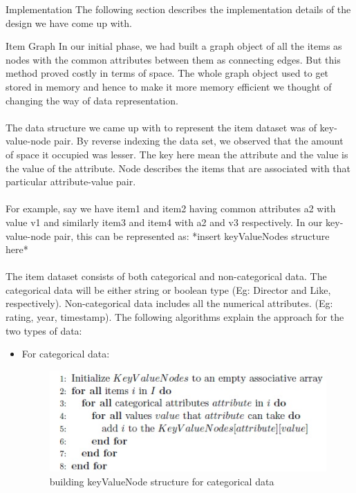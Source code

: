 \documentclass{report}
\begin{document}
\begin{projChapter}{Implementation}
        The following section describes the implementation details of the design we have come up with.
        \begin{projSection}{Item Graph}
            In our initial phase, we had built a graph object of all the items as nodes with the common attributes between them as connecting edges. But this method proved costly in terms of space. The whole graph object used to get stored in memory and hence to make it more memory efficient we thought of changing the way of data representation.
            ~\\\\
            The data structure we came up with to represent the item dataset was of key-value-node pair. By reverse indexing the data set, we observed that the amount of space it occupied was lesser. The key here mean the attribute and the value is the value of the attribute. Node describes the items that are associated with that particular attribute-value pair.
            ~\\\\
            For example, say we have item1 and item2 having common attributes a2 with value v1 and similarly item3 and item4 with a2 and v3 respectively. In our key-value-node pair, this can be represented as:
            *insert keyValueNodes structure here*
            ~\\\\
            The item dataset consists of both categorical and non-categorical data. The categorical data will be either string or boolean type (Eg: Director and Like, respectively). Non-categorical data includes all the numerical attributes. (Eg: rating, year, timestamp).  The following algorithms explain the approach for the two types of data:
            
\begin{itemize}
  \item For categorical data:
                    \begin{figure}[ht!]
\centering
\includegraphics[scale=0.8]{images/categorical.png}
\caption{building keyValueNode structure for categorical data}
\label{categorical}
\end{figure}



\end{itemize}
\end{projSection}
\end{projChapter}
\end{document}
